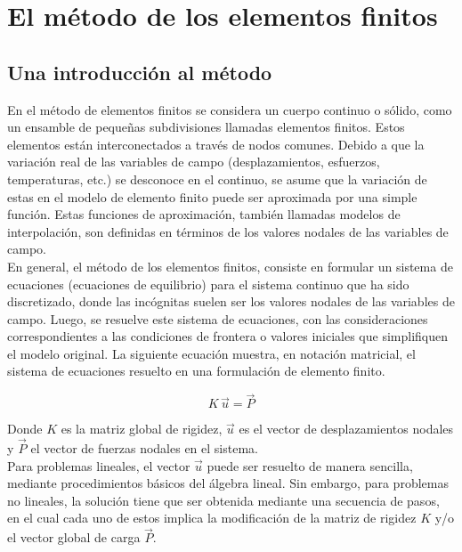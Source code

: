 
\section{El método de los elementos finitos}

\subsection{Una introducción al método}

En el método de elementos finitos se considera un cuerpo continuo o sólido, como un ensamble de pequeñas 
subdivisiones llamadas elementos finitos. Estos elementos están interconectados a través de nodos comunes. 
Debido a que la variación real de las variables de campo (desplazamientos, esfuerzos, temperaturas, etc.) 
se desconoce en el continuo, se asume que la variación de estas en el modelo de elemento finito puede ser 
aproximada por una simple función. Estas funciones de aproximación, también llamadas modelos de interpolación, 
son definidas en términos de los valores nodales de las variables de campo.\\

En general, el método de los elementos finitos, consiste en formular un sistema de ecuaciones 
(ecuaciones de equilibrio) para el sistema continuo que ha sido discretizado, donde las incógnitas 
suelen ser los valores nodales de las variables de campo. Luego, se resuelve este sistema de ecuaciones, 
con las consideraciones correspondientes a las condiciones de frontera o valores iniciales que simplifiquen 
el modelo original. La siguiente ecuación muestra, en notación matricial, el sistema de ecuaciones resuelto 
en una formulación de elemento finito.

\begin{equation} \label{eq:fem_simple}
K\,\vec{u} = \vec{P}
\end{equation}

Donde $K$ es la matriz global de rigidez, $\vec{u}$ es el vector de desplazamientos nodales y $\vec{P}$ el 
vector de fuerzas nodales en el sistema.\\

Para problemas lineales, el vector $\vec{u}$ puede ser resuelto de manera sencilla, mediante 
procedimientos básicos del álgebra lineal. Sin embargo, para problemas no lineales, la solución 
tiene que ser obtenida mediante una secuencia de pasos, en el cual cada uno de estos implica la 
modificación de la matriz de rigidez $K$ y/o el vector global de carga $\vec{P}$.\\

